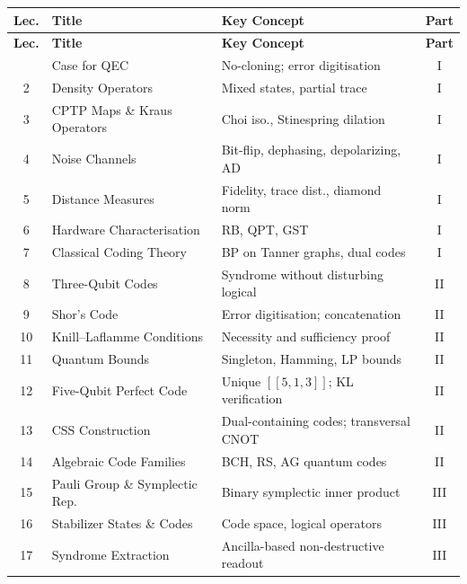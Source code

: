 \documentclass[12pt,oneside]{article}
\begin{document}
{\small
\begin{longtable}{@{}cll c@{}}
  \toprule
  \textbf{Lec.} & \textbf{Title} & \textbf{Key Concept} & \textbf{Part} \\
  \midrule
  \endfirsthead
  \toprule
  \textbf{Lec.} & \textbf{Title} & \textbf{Key Concept} & \textbf{Part} \\
  \midrule
  \endhead
  \bottomrule
  \endfoot
  1  & Case for QEC                    & No-cloning; error digitisation          & I \\
  2  & Density Operators               & Mixed states, partial trace             & I \\
  3  & CPTP Maps \& Kraus Operators    & Choi iso., Stinespring dilation         & I \\
  4  & Noise Channels                  & Bit-flip, dephasing, depolarizing, AD   & I \\
  5  & Distance Measures               & Fidelity, trace dist., diamond norm     & I \\
  6  & Hardware Characterisation       & RB, QPT, GST                           & I \\
  7  & Classical Coding Theory         & BP on Tanner graphs, dual codes         & I \\
  \midrule
  8  & Three-Qubit Codes               & Syndrome without disturbing logical     & II \\
  9  & Shor's Code                     & Error digitisation; concatenation       & II \\
  10 & Knill--Laflamme Conditions      & Necessity and sufficiency proof         & II \\
  11 & Quantum Bounds                  & Singleton, Hamming, LP bounds           & II \\
  12 & Five-Qubit Perfect Code         & Unique $[[5,1,3]]$; KL verification     & II \\
  13 & CSS Construction                & Dual-containing codes; transversal CNOT & II \\
  14 & Algebraic Code Families         & BCH, RS, AG quantum codes               & II \\
  \midrule
  15 & Pauli Group \& Symplectic Rep.  & Binary symplectic inner product         & III \\
  16 & Stabilizer States \& Codes      & Code space, logical operators           & III \\
  17 & Syndrome Extraction             & Ancilla-based non-destructive readout   & III \\

\end{longtable}}
\end{document}
